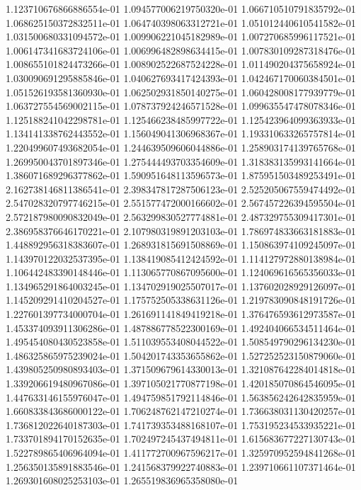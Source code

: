 1.123710676866886554e-01
1.094577006219750320e-01
1.066710510791835792e-01
1.068625150372832511e-01
1.064740398063312721e-01
1.051012440610541582e-01
1.031500680331094572e-01
1.009906221045182989e-01
1.007270685996117521e-01
1.006147341683724106e-01
1.006996482898634415e-01
1.007830109287318476e-01
1.008655101824473266e-01
1.008902522687524228e-01
1.011490204375658924e-01
1.030090691295885846e-01
1.040627693417424393e-01
1.042467170060384501e-01
1.051526193581360930e-01
1.062502931850140275e-01
1.060428008177939779e-01
1.063727554569002115e-01
1.078737924246571528e-01
1.099635547478078346e-01
1.125188241042298781e-01
1.125466238485997722e-01
1.125423964099363933e-01
1.134141338762443552e-01
1.156049041306968367e-01
1.193310633265757814e-01
1.220499607493682054e-01
1.244639509606044886e-01
1.258903174139765768e-01
1.269950043701897346e-01
1.275444493703354609e-01
1.318383135993141664e-01
1.386071689296377862e-01
1.590951648113596573e-01
1.875951503489253491e-01
2.162738146811386541e-01
2.398347817287506123e-01
2.525205067559474492e-01
2.547028320797746215e-01
2.551577472000166602e-01
2.567457226394595504e-01
2.572187980090832049e-01
2.563299830527774881e-01
2.487329755309417301e-01
2.386958376646170221e-01
2.107980319891203103e-01
1.786974833663181883e-01
1.448892956318383607e-01
1.268931815691508869e-01
1.150863974109245097e-01
1.143970122032537395e-01
1.138419085412424592e-01
1.114127972880138984e-01
1.106442483390148446e-01
1.113065770867095600e-01
1.124069616565356033e-01
1.134965291864003245e-01
1.134702919025507017e-01
1.137602028929126097e-01
1.145209291410204527e-01
1.175752505338631126e-01
1.219783090848191726e-01
1.227601397734000704e-01
1.261691141849419218e-01
1.376476593612973587e-01
1.453374093911306286e-01
1.487886778522300169e-01
1.492404066534511464e-01
1.495454080430523858e-01
1.511039553408044522e-01
1.508549790296134230e-01
1.486325865975239024e-01
1.504201743353655862e-01
1.527252523150879060e-01
1.439805250980893403e-01
1.371509679614330013e-01
1.321087642284014818e-01
1.339206619480967086e-01
1.397105021770877198e-01
1.420185070864546095e-01
1.447633146155976047e-01
1.494759851792114846e-01
1.563856242642835959e-01
1.660833843686000122e-01
1.706248762147210274e-01
1.736638031130420257e-01
1.736812022640187303e-01
1.741739353488168107e-01
1.753195234533935221e-01
1.733701894170152635e-01
1.702497245437494811e-01
1.615683677227130743e-01
1.522789865406964094e-01
1.411772700967596217e-01
1.325970952594841268e-01
1.256350135891883546e-01
1.241568379922740883e-01
1.239710661107371464e-01
1.269301608025253103e-01
1.265519836965358080e-01
